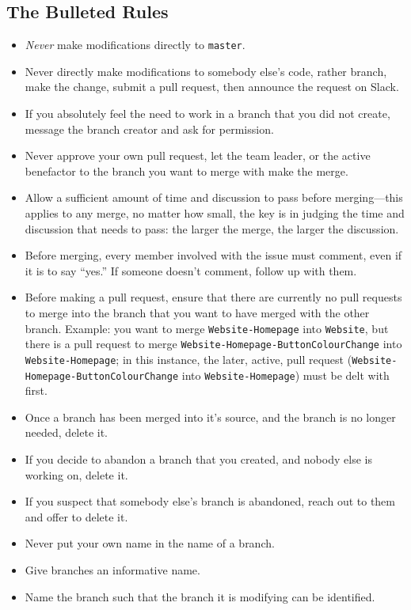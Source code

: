 \documentclass[12pt]{article}
\begin{document}
  \subsection{The Bulleted Rules}
  \begin{itemize}
   \item \textit{Never} make modifications directly to \texttt{master}.
   \item Never directly make modifications to somebody else's code, rather branch, make the change, submit a pull request, then announce the request on Slack.
   \item If you absolutely feel the need to work in a branch that you did not create, message the branch creator and ask for permission.
   \item Never approve your own pull request, let the team leader, or the active benefactor to the branch you want to merge with make the merge.
   \item Allow a sufficient amount of time and discussion to pass before merging---this applies to any merge, no matter how small, the key is in judging the time and discussion that needs to pass: the larger the merge, the larger the discussion.
   \item Before merging, every member involved with the issue must comment, even if it is to say ``yes.'' If someone doesn't comment, follow up with them.
   \item Before making a pull request, ensure that there are currently no pull requests to merge into the branch that you want to have merged with the other branch. Example: you want to merge \texttt{Website-Homepage} into \texttt{Website}, but there is a pull request to merge \texttt{Website-Homepage-ButtonColourChange} into \texttt{Website-Homepage}; in this instance, the later, active, pull request (\texttt{Website-Homepage-ButtonColourChange} into \texttt{Website-Homepage}) must be delt with first.
   \item Once a branch has been merged into it's source, and the branch is no longer needed, delete it.
   \item If you decide to abandon a branch that you created, and nobody else is working on, delete it.
   \item If you suspect that somebody else's branch is abandoned, reach out to them and offer to delete it.
   \item Never put your own name in the name of a branch.
   \item Give branches an informative name.
   \item Name the branch such that the branch it is modifying can be identified.
   
  \end{itemize}


  
\end{document}
